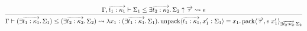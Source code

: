 \documentclass[lualatex,12pt,unicode]{article}
\begin{document}
\[
    \begin{prooftree}
        \hypo{\Gamma, \overrightarrow{t_1: \kappa_1} \vdash \Sigma_1 \leq \exists \overrightarrow{t_2: \kappa_2}\ldotp \Sigma_2 \uparrow \overrightarrow{\tau} \rightsquigarrow e}
        \infer1{\Gamma \vdash (\exists \overrightarrow{t_1: \kappa_1}\ldotp \Sigma_1) \leq (\exists \overrightarrow{t_2: \kappa_2}\ldotp \Sigma_2) \rightsquigarrow \lambda x_1: (\exists \overrightarrow{t_1: \kappa_1}\ldotp \Sigma_1)\ldotp \mathrm{unpack}\langle \overrightarrow{t_1: \kappa_1}, x_1': \Sigma_1\rangle = x_1\ldotp \mathrm{pack}\langle \overrightarrow{\tau}, e\; x_1'\rangle_{\exists \overrightarrow{t_2: \kappa_2}\ldotp \Sigma_2}}
    \end{prooftree}
\]
\end{document}
